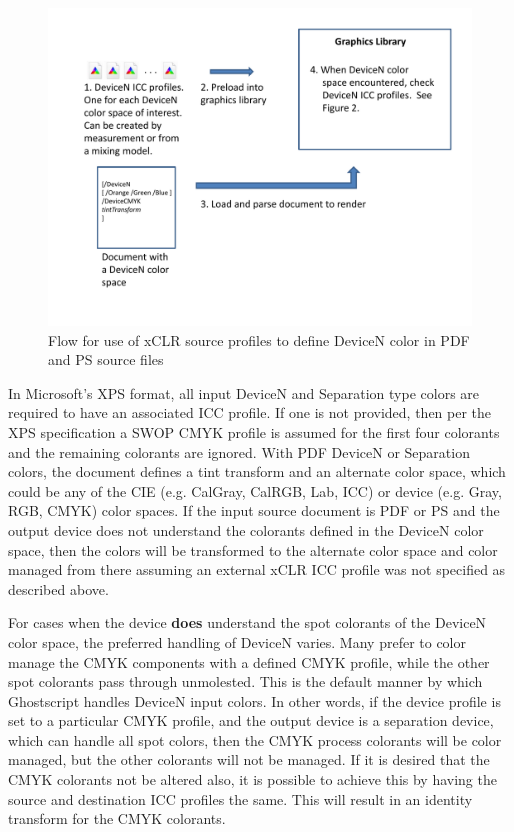 \documentclass[12pt,notitlepage]{article}
\begin{document}
\begin{figure}
    \begin{center}
\includegraphics*[width=5.5in]{figures/DeviceN_Figure1.pdf}
    \end{center}
   \caption{Flow for use of xCLR source profiles to define DeviceN color in PDF and PS source files }
    \label{fig:DeviceN}
\end{figure}

In Microsoft's XPS format, all input DeviceN and Separation type colors are required to have an associated ICC profile.  If one is not provided, then per the XPS specification\cite{XPS} a SWOP CMYK profile is assumed for the first four colorants and the remaining colorants are ignored. With PDF DeviceN or Separation colors, the document defines a tint transform and an alternate color space, which could be any of the CIE (e.g. CalGray, CalRGB, Lab, ICC) or device (e.g. Gray, RGB, CMYK) color spaces.  If the input source document is PDF or PS and the output device does not understand the colorants defined in the DeviceN color space, then the colors will be transformed to the alternate color space and color managed from there assuming an external xCLR ICC profile was not specified as described above.

For cases when the device {\bf does} understand the spot colorants of the DeviceN color space, the preferred handling of DeviceN varies.  Many prefer to color manage the CMYK components with a defined CMYK profile, while the other spot colorants pass through unmolested. This is the default manner by which Ghostscript handles DeviceN input colors.  In other words, if the device profile is set to a particular CMYK profile, and the output device is a separation device, which can handle all spot colors, then the CMYK process colorants will be color managed, but the other colorants will not be managed.  If it is desired that the CMYK colorants not be altered also, it is possible to achieve this by having the source and destination ICC profiles the same.  This will result in an identity transform for the CMYK colorants.
\end{document}
